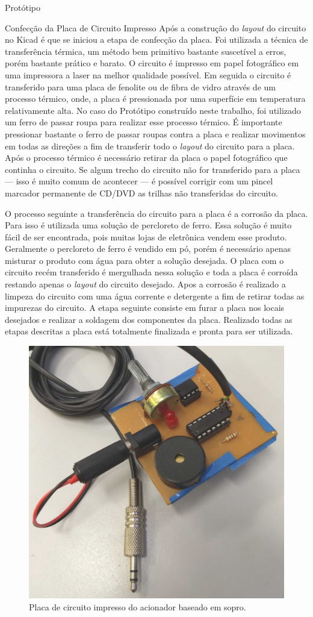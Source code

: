 \begin{chapter}{Protótipo}
\begin{section}{Confecção da Placa de Circuito Impresso}
Após a construção do \textit{layout} do circuito no Kicad é que se iniciou a
etapa de confecção da placa. Foi utilizada a técnica de transferência térmica,
um método bem primitivo bastante suscetível a erros, porém bastante prático e
barato. O circuito é impresso em papel fotográfico em uma impressora a laser na
melhor qualidade possível. Em seguida o circuito é transferido para uma placa de
fenolite ou de fibra de vidro através de um processo térmico, onde, a placa é
pressionada por uma superfície em temperatura relativamente alta. No caso do
Protótipo construído neste trabalho, foi utilizado um ferro de passar roupa para
realizar esse processo térmico. É importante pressionar bastante o ferro de
passar roupas contra a placa e realizar movimentos em todas as direções a fim 
de transferir todo o \textit{layout} do circuito para a placa. Após o processo
térmico é necessário retirar da placa o papel fotográfico que continha o 
circuito. Se algum trecho do circuito não for transferido para a placa --- isso
é muito comum de acontecer --- é possível corrigir com um pincel
marcador permanente de CD/DVD as trilhas não transferidas do circuito.  

O processo seguinte a transferência do circuito para a placa é a corrosão da
placa. Para isso é utilizada uma solução de percloreto de ferro. Essa solução é
muito fácil de ser encontrada, pois muitas lojas de eletrônica vendem esse
produto. Geralmente o percloreto de ferro é vendido em pó, porém é necessário
apenas misturar o produto com água para obter a solução desejada. O placa com o
circuito recém transferido é mergulhada nessa solução e toda a placa é corroída
restando apenas o \textit{layout} do circuito desejado. Apos a corrosão é
realizado a limpeza do circuito com uma água corrente e detergente a fim de
retirar todas as impurezas do circuito. A etapa seguinte consiste em furar a
placa nos locais desejados e realizar a soldagem dos componentes da placa.
Realizado todas as etapas descritas a placa está totalmente finalizada e pronta
para ser utilizada. 

\begin{figure}[!h]
	\centering
	\begin{minipage}[c]{\textwidth}
	\centering
	\includegraphics[width=0.45\linewidth]{fig/puff2}
	\caption{Placa de circuito impresso do acionador baseado em sopro.}
	\label{fig:placa}
	\end{minipage}
\end{figure} 


\end{section}
\end{chapter}
